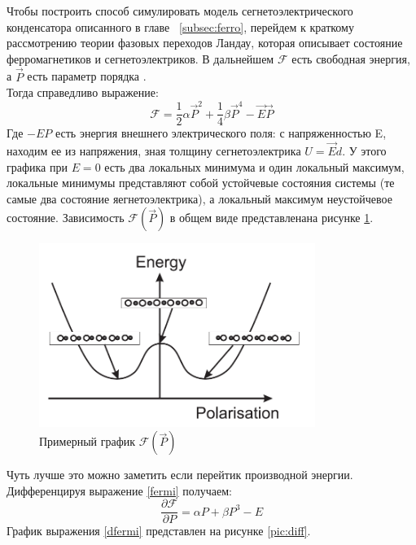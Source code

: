 \documentclass[a4paper,12pt]{article} %
\begin{document}
Чтобы построить способ симулировать модель сегнетоэлектрического конденсатора описанного в главе ~\ref{subsec:ferro}, перейдем к краткому рассмотрению теории фазовых переходов Ландау, которая описывает состояние ферромагнетиков и сегнетоэлектриков. В дальнейшем  $\mathcal{F} $ есть свободная энергия, а $ \vec{P}$ есть параметр порядка   .\\
  Тогда справедливо выражение:
  \begin{equation}\label{fermi}
   \mathcal{F} = \frac{1}{2}\alpha \vec{P}^2 + \frac{1}{4}\beta \vec{P}^4 - \vec{E}\vec{P}
  \end{equation}
 Где $ -EP  $ есть энергия внешнего электрического поля: с напряженностью E, находим ее из напряжения, зная толщину сегнетоэлектрика $U= \vec{E}d $. У этого графика при $E=0 $ есть два локальных минимума и один локальный максимум, локальные минимумы представляют собой устойчевые состояния системы (те самые два состояние яегнетоэлектрика), а локальный максимум неустойчевое состояние. Зависимость $\mathcal{F}(\vec{P})$ в общем виде представленана рисунке \ref{pic:f}.
 
 
   \begin{figure}
   \centering
  \includegraphics[width=0.8\textwidth]{F(P).png}
  \caption{Примерный график $\mathcal{F}(\vec{P})$ \cite{ferro}}
  \label{pic:f}
  \end{figure}
 
 
 Чуть лучше это можно заметить если перейтик производной энергии. Дифференцируя выражение \eqref{fermi} получаем:
  \begin{equation}\label{dfermi}
  \frac{\partial \mathcal{F}}{\partial P }  = \alpha P + \beta P^3 - E
  \end{equation}
  График выражения \ref{dfermi} представлен на рисунке \ref{pic:diff}.
  
  
  
\end{document}
